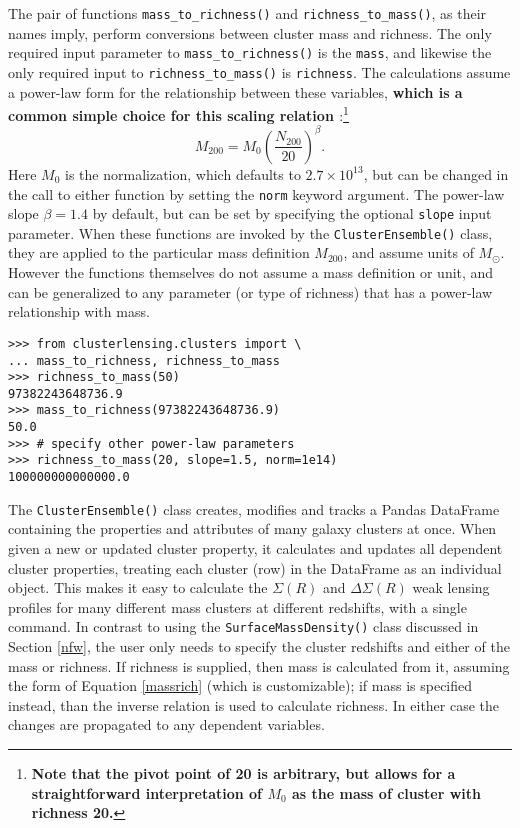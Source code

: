 \documentclass[twocolumn]{aastex6}
\newcommand{\code}{\lstinline[style=codeintext]}
\begin{document}
The pair of functions \code{mass_to_richness()} and \code{richness_to_mass()}, as their names imply, perform conversions between cluster mass and richness. The only required input parameter to \code{mass_to_richness()} is the \code{mass}, and likewise the only required input to \code{richness_to_mass()} is \code{richness}. The calculations assume a power-law form for the relationship between these variables, {\bf which is a common simple choice for this scaling relation \citep[e.g.][]{Johnston07, Mandelbaum08b, Andreon10}}:\footnote{\bf Note that the pivot point of 20 is arbitrary, but allows for a straightforward interpretation of $M_0$ as the mass of cluster with richness 20.}
\begin{equation}\label{massrich}
M_{200} = M_0 \left( \frac{N_{200}}{20} \right) ^ \beta.
\end{equation}
Here $M_0$ is the normalization, which defaults to $2.7 \times 10^{13}$, but can be changed in the call to either function by setting the \code{norm} keyword argument. The power-law slope $\beta = 1.4$ by default, but can be set by specifying the optional \code{slope} input parameter. When these functions are invoked by the \code{ClusterEnsemble()} class, they are applied to the particular mass definition $M_{200}$, and assume units of $M_{\odot}$. However the functions themselves do not assume a mass definition or unit, and can be generalized to any parameter (or type of richness) that has a power-law relationship with mass.

\begin{verbatim}
>>> from clusterlensing.clusters import \
... mass_to_richness, richness_to_mass
>>> richness_to_mass(50)
97382243648736.9
>>> mass_to_richness(97382243648736.9)
50.0
>>> # specify other power-law parameters
>>> richness_to_mass(20, slope=1.5, norm=1e14)
100000000000000.0
\end{verbatim}

The \code{ClusterEnsemble()} class creates, modifies and tracks a Pandas DataFrame containing the properties and attributes of many galaxy clusters at once. When given a new or updated cluster property, it calculates and updates all dependent cluster properties, treating each cluster (row) in the DataFrame as an individual object. This makes it easy to calculate the $\Sigma(R)$ and $\Delta\Sigma(R)$ weak lensing profiles for many different mass clusters at different redshifts, with a single command. In contrast to using the \code{SurfaceMassDensity()} class discussed in Section \ref{nfw}, the user only needs to specify the cluster redshifts and either of the mass or richness. If richness is supplied, then mass is calculated from it, assuming the form of Equation \ref{massrich} (which is customizable); if mass is specified instead, than the inverse relation is used to calculate richness. In either case the changes are propagated to any dependent variables.
\end{document}
